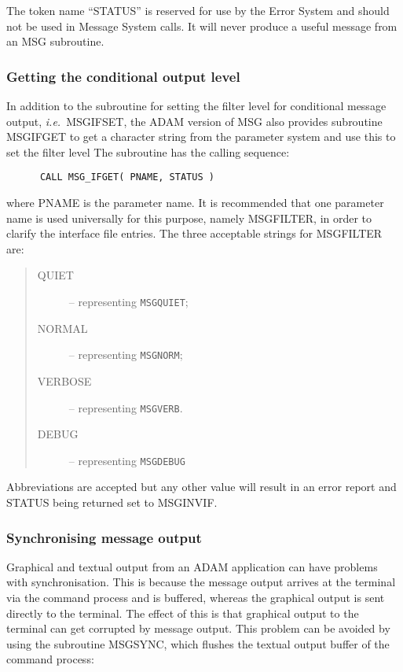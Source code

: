 \documentclass[twoside,11pt]{article}
\newcommand{\xlabel}[1]{}
\renewcommand{\_}{\texttt{\symbol{95}}}
\newcommand{\const}[1]{\texttt{#1}}
\newcommand{\msgnorm}{\const{MSG\_\_NORM}}
\newcommand{\msgverb}{\const{MSG\_\_VERB}}
\newcommand{\msgquiet}{\const{MSG\_\_QUIET}}
\newcommand{\msgdebug}{\const{MSG\_\_DEBUG}}
\begin{document}
The token name ``STATUS'' is reserved for use by the Error System and should
not be used in Message System calls. It will never produce a useful message
from an MSG subroutine.


\subsubsection{\xlabel{getting_the_conditional_output_level}Getting the conditional output level}

In addition to the subroutine for setting the filter level for conditional
message output, \textit{i.e.}\ MSG\_IFSET, the ADAM version of MSG also provides 
subroutine MSG\_IFGET to get a character string from the parameter system and
use this to set the filter level
The subroutine has the calling sequence:

\begin {small}
\begin{verbatim}
      CALL MSG_IFGET( PNAME, STATUS )
\end{verbatim}
\end {small}

where PNAME is the parameter name.
It is recommended that one parameter name is used universally for this purpose,
namely MSG\_FILTER, in order to clarify the interface file entries.
The three acceptable strings for MSG\_FILTER are:

\begin {quote}
\begin {description}
\item [QUIET] -- representing \msgquiet;
\item [NORMAL] -- representing \msgnorm;
\item [VERBOSE] -- representing \msgverb.
\item [DEBUG] -- representing \msgdebug\
\end {description}
\end {quote}
Abbreviations are accepted but
any other value will result in an error report and STATUS being
returned set to MSG\_\_INVIF.


\subsubsection{\xlabel{synchronising_message_output}Synchronising message output}

Graphical and textual output from an ADAM application can have problems with
synchronisation.
This is because the message output arrives at the terminal via the command
process and is buffered, whereas the graphical output is sent directly to the
terminal.
The effect of this is that graphical output to the terminal can get corrupted by
message output.
This problem can be avoided by using the subroutine MSG\_SYNC, which flushes
the textual output buffer of the command process:
\end{document}
